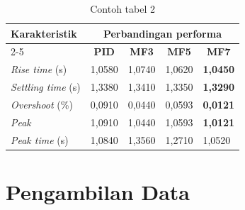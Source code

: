 \begin{table}[H]
    \centering
    \caption{Contoh tabel 2}
    \label{t-perbandinganRespon}
    \begin{tabular}{lllll}
        \hline
        \multirow{2}{*}{Karakteristik} & \multicolumn{4}{c}{Perbandingan performa} \\ 
        \cline{2-5}
        & \multicolumn{1}{c}{\textbf{PID}} 
        & \multicolumn{1}{c}{\textbf{MF3}} 
        & \multicolumn{1}{c}{\textbf{MF5}} 
        & \multicolumn{1}{c}{\textbf{MF7}} \\ 
        \hline
        
        \textit{Rise time} (s)     & 1,0580 & 1,0740 & 1,0620 & \textbf{1,0450} \\
        \textit{Settling time} (s) & 1,3380 & 1,3410 & 1,3350 & \textbf{1,3290} \\
        \textit{Overshoot} (\%)    & 0,0910 & 0,0440 & 0,0593 & \textbf{0,0121} \\
        \textit{Peak}              & 1,0910 & 1,0440 & 1,0593 & \textbf{1,0121} \\
        \textit{Peak time} (s)     & 1,0840 & 1,3560 & 1,2710 & 1,0520 \\ 
        \hline
    \end{tabular}
\end{table}

\lipsum[2]

\section{Pengambilan Data}
\lipsum[2]

